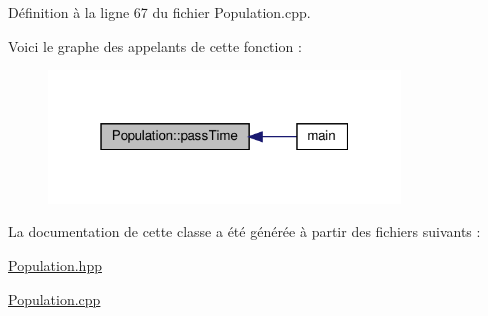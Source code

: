 Définition à la ligne 67 du fichier Population.\+cpp.

Voici le graphe des appelants de cette fonction \+:
\nopagebreak
\begin{figure}[H]
\begin{center}
\leavevmode
\includegraphics[width=265pt]{classPopulation_a4a4eef2f12f2f46c1fafef5ca4db2933_icgraph}
\end{center}
\end{figure}


La documentation de cette classe a été générée à partir des fichiers suivants \+:\begin{DoxyCompactItemize}
\item 
\hyperlink{Population_8hpp}{Population.\+hpp}\item 
\hyperlink{Population_8cpp}{Population.\+cpp}\end{DoxyCompactItemize}
